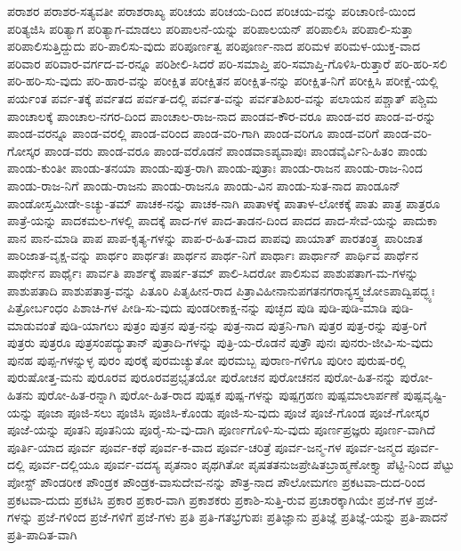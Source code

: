 {ಪರಾಶರ
ಪರಾಶರ-ಸತ್ಯವತೀ
ಪರಾಶರಾಖ್ಯ
ಪರಿಚಯ
ಪರಿಚಯ-ದಿಂದ
ಪರಿಚಯ-ವನ್ನು
ಪರಿಚಾರಿಣಿ-ಯಿಂದ
ಪರಿತ್ಯಜಿಸಿ
ಪರಿತ್ಯಾಗ
ಪರಿತ್ಯಾಗ-ಮಾಡಲು
ಪರಿಪಾಲನೆ-ಯನ್ನು
ಪರಿಪಾಲಯನ್
ಪರಿಪಾಲಿಸಿ
ಪರಿಪಾಲಿ-ಸುತ್ತಾ
ಪರಿಪಾಲಿಸುತ್ತಿದ್ದುದು
ಪರಿ-ಪಾಲಿಸು-ವುದು
ಪರಿಪೂರ್ಣತ್ವ
ಪರಿಪೂರ್ಣ-ನಾದ
ಪರಿಮಳ
ಪರಿಮಳ-ಯುಕ್ತ-ವಾದ
ಪರಿವಾರ
ಪರಿವಾರ-ವರ್ಗದ-ವ-ರನ್ನೂ
ಪರಿಶೀಲಿ-ಸಿದರೆ
ಪರಿ-ಸಮಾಪ್ತಿ
ಪರಿ-ಸಮಾಪ್ತಿ-ಗೊಳಿಸಿ-ರುತ್ತಾರೆ
ಪರಿ-ಹರಿ-ಸಲಿ
ಪರಿ-ಹರಿ-ಸು-ವುದು
ಪರಿ-ಹಾರ-ವನ್ನು
ಪರೀಕ್ಷಿತ
ಪರೀಕ್ಷಿತನ
ಪರೀಕ್ಷಿತ-ನನ್ನು
ಪರೀಕ್ಷಿತ-ನಿಗೆ
ಪರೀಕ್ಷಿಸಿ
ಪರೀಕ್ಷೆ-ಯಲ್ಲಿ
ಪರ್ಯಂತ
ಪರ್ವ-ತಕ್ಕೆ
ಪರ್ವತದ
ಪರ್ವತ-ದಲ್ಲಿ
ಪರ್ವತ-ವನ್ನು
ಪರ್ವತಶಿಖರ-ವನ್ನು
ಪಲಾಯನ
ಪಶ್ಚಾತ್
ಪಶ್ಚಿಮ
ಪಾಂಚಾಲಕ್ಕೆ
ಪಾಂಚಾಲ-ನಗರ-ದಿಂದ
ಪಾಂಚಾಲ-ರಾಜ-ನಾದ
ಪಾಂಡವ-ಕೌರ-ವರೂ
ಪಾಂಡ-ವರ
ಪಾಂಡ-ವ-ರನ್ನು
ಪಾಂಡ-ವರನ್ನೂ
ಪಾಂಡ-ವರಲ್ಲಿ
ಪಾಂಡ-ವರಿಂದ
ಪಾಂಡ-ವರಿ-ಗಾಗಿ
ಪಾಂಡ-ವರಿಗೂ
ಪಾಂಡ-ವರಿಗೆ
ಪಾಂಡ-ವರಿ-ಗೋಸ್ಕರ
ಪಾಂಡ-ವರು
ಪಾಂಡ-ವರೂ
ಪಾಂಡ-ವರೊಡನೆ
ಪಾಂಡವಾಽಪ್ಯವಾಪುಃ
ಪಾಂಡವೈರ್ವಿನಿ-ಹಿತಂ
ಪಾಂಡು
ಪಾಂಡು-ಕುಂತೀ
ಪಾಂಡು-ತನಯಾ
ಪಾಂಡು-ಪುತ್ರ-ರಾಗಿ
ಪಾಂಡು-ಪುತ್ರಾಃ
ಪಾಂಡು-ರಾಜನ
ಪಾಂಡು-ರಾಜ-ನಿಂದ
ಪಾಂಡು-ರಾಜ-ನಿಗೆ
ಪಾಂಡು-ರಾಜನು
ಪಾಂಡು-ರಾಜನೂ
ಪಾಂಡು-ವಿನ
ಪಾಂಡು-ಸುತ-ನಾದ
ಪಾಂಡೂನ್
ಪಾಂಡೋಸ್ತಮೀಡೇ-ಽಚ್ಯು-ತಮ್
ಪಾಚಕ-ನನ್ನು
ಪಾಚಕ-ನಾಗಿ
ಪಾತಾಳಕ್ಕೆ
ಪಾತಾಳ-ಲೋಕಕ್ಕೆ
ಪಾತು
ಪಾತ್ರ
ಪಾತ್ರರೂ
ಪಾತ್ರೆ-ಯನ್ನು
ಪಾದಕಮಲ-ಗಳಲ್ಲಿ
ಪಾದಕ್ಕೆ
ಪಾದ-ಗಳ
ಪಾದ-ತಾಡನ-ದಿಂದ
ಪಾದದ
ಪಾದ-ಸೇವೆ-ಯನ್ನು
ಪಾದುಕಾ
ಪಾನ
ಪಾನ-ಮಾಡಿ
ಪಾಪ
ಪಾಪ-ಕೃತ್ಯ-ಗಳನ್ನು
ಪಾಪ-ರ-ಹಿತ-ವಾದ
ಪಾಪವು
ಪಾಯಾತ್
ಪಾರತಂತ್ರ್ಯ
ಪಾರಿಜಾತ
ಪಾರಿಜಾತ-ವೃಕ್ಷ-ವನ್ನು
ಪಾರ್ಥಂ
ಪಾರ್ಥತಃ
ಪಾರ್ಥನ
ಪಾರ್ಥ-ನಿಗೆ
ಪಾರ್ಥಾಃ
ಪಾರ್ಥಾನ್
ಪಾರ್ಥಿವ
ಪಾರ್ಥೆನ
ಪಾರ್ಥೇನ
ಪಾರ್ಥೈಃ
ಪಾರ್ವತಿ
ಪಾರ್ಶಕ್ಕೆ
ಪಾರ್ಷ-ತಮ್
ಪಾಲಿ-ಸಿದರೋ
ಪಾಲಿಸುವ
ಪಾಶುಪತಾಗ-ಮ-ಗಳನ್ನು
ಪಾಶುಪತಾದಿ
ಪಾಶುಪತಾತ್ರ-ವನ್ನು
ಪಿತೂರಿ
ಪಿತೃಹೀನ-ರಾದ
ಪಿತ್ರಾವಿಹೀನಾನುಪಗತನಗರಾನ್ಯಸ್ತ್ವಜೋಽಪಾದ್ವಿಪದ್ಭ್ಯಃ
ಪಿತ್ರೋರ್ಬಂಧಂ
ಪಿಶಾಚಿ-ಗಳ
ಪೀಡಿ-ಸು-ವುದು
ಪುಂಡರೀಕಾಕ್ಷ-ನನ್ನು
ಪುಚ್ಛದ
ಪುಡಿ
ಪುಡಿ-ಪುಡಿ-ಮಾಡಿ
ಪುಡಿ-ಮಾಡುವಂತೆ
ಪುಡಿ-ಯಾಗಲು
ಪುತ್ರಂ
ಪುತ್ರನ
ಪುತ್ರ-ನನ್ನು
ಪುತ್ರ-ನಾದ
ಪುತ್ರನಿ-ಗಾಗಿ
ಪುತ್ರರ
ಪುತ್ರ-ರನ್ನು
ಪುತ್ರ-ರಿಗೆ
ಪುತ್ರರು
ಪುತ್ರರೂ
ಪುತ್ರಸಂಪದ್ಯುತಾನ್
ಪುತ್ರಾದಿ-ಗಳನ್ನು
ಪುತ್ರಿ-ಯ-ರೊಡನೆ
ಪುತ್ರೌ
ಪುನಃ
ಪುನರು-ಜೀವಿ-ಸು-ವುದು
ಪುನಹ
ಪುಪ್ಪ-ಗಳನ್ನುಳ್ಳ
ಪುರಂ
ಪುರಕ್ಕೆ
ಪುರಮಚ್ಯುತೋ
ಪುರಮಬ್ಬ
ಪುರಾಣ-ಗಳಿಗೂ
ಪುರೀಂ
ಪುರುಷ-ರಲ್ಲಿ
ಪುರುಷೋತ್ತ-ಮನು
ಪುರೂರವ
ಪುರೂರವಪ್ರಭೃತಯೋ
ಪುರೋಚನ
ಪುರೋಚನನ
ಪುರೋ-ಹಿತ-ನನ್ನು
ಪುರೋ-ಹಿತನು
ಪುರೋ-ಹಿತ-ರನ್ನಾಗಿ
ಪುರೋ-ಹಿತ-ರಾದ
ಪುಷ್ಪಕ
ಪುಷ್ಪ-ಗಳನ್ನು
ಪುಷ್ಪಗ್ರಹಣ
ಪುಷ್ಪಮಾಲಾರ್ಪಣೆ
ಪುಷ್ಪವೃಷ್ಟಿ-ಯನ್ನು
ಪೂಜಾ
ಪೂಜಿ-ಸಲು
ಪೂಜಿಸಿ
ಪೂಜಿಸಿ-ಕೊಂಡು
ಪೂಜಿ-ಸು-ವುದು
ಪೂಜೆ
ಪೂಜೆ-ಗೊಂಡ
ಪೂಜೆ-ಗೋಸ್ಕರ
ಪೂಜೆ-ಯನ್ನು
ಪೂತನಿ
ಪೂತನಿಯ
ಪೂರೈ-ಸು-ವು-ದಾಗಿ
ಪೂರ್ಣಗೊಳಿ-ಸು-ವುದು
ಪೂರ್ಣಪ್ರಜ್ಞರು
ಪೂರ್ಣ-ವಾಗಿದೆ
ಪೂರ್ತಿ-ಯಾದ
ಪೂರ್ವ
ಪೂರ್ವ-ಕಥೆ
ಪೂರ್ವ-ಕ-ವಾದ
ಪೂರ್ವ-ಚರಿತ್ರೆ
ಪೂರ್ವ-ಜನ್ಮ-ಗಳ
ಪೂರ್ವ-ಜನ್ಮದ
ಪೂರ್ವ-ದಲ್ಲಿ
ಪೂರ್ವ-ದಲ್ಲಿಯೂ
ಪೂರ್ವ-ವದಸ್ಯ
ಪೃತನಾಂ
ಪೃಥಗಿತೋ
ಪೃಷತತನುಜಪ್ರೇಷಿತಬ್ರಾಹ್ಮಣೋಕ್ತ್ಯಾ
ಪೆಟ್ಟಿ-ನಿಂದ
ಪೆಟ್ಟು
ಪೋಸ್ಟ್
ಪೌಂಡರೀಕ
ಪೌಂಡ್ರಕ
ಪೌಂಡ್ರಕ-ವಾಸುದೇವ-ನನ್ನು
ಪೌತ್ರ-ನಾದ
ಪೌಲೋಮಗಣ
ಪ್ರಕಟವಾ-ದುದ-ರಿಂದ
ಪ್ರಕಟವಾ-ದುದು
ಪ್ರಕಟಿಸಿ
ಪ್ರಕಾರ
ಪ್ರಕಾರ-ವಾಗಿ
ಪ್ರಕಾಶಕರು
ಪ್ರಕಾಶಿ-ಸುತ್ತಿ-ರುವ
ಪ್ರಚಾರಕ್ಕಾಗಿಯೇ
ಪ್ರಜೆ-ಗಳ
ಪ್ರಜೆ-ಗಳನ್ನು
ಪ್ರಜೆ-ಗಳಿಂದ
ಪ್ರಜೆ-ಗಳಿಗೆ
ಪ್ರಜೆ-ಗಳು
ಪ್ರತಿ
ಪ್ರತಿ-ಗತಭ್ರಗುಪಃ
ಪ್ರತಿಜ್ಞಾನು
ಪ್ರತಿಜ್ಞೆ
ಪ್ರತಿಜ್ಞೆ-ಯನ್ನು
ಪ್ರತಿ-ಪಾದನೆ
ಪ್ರತಿ-ಪಾದಿತ-ವಾಗಿ
}
